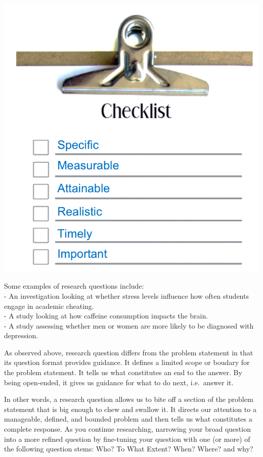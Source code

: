 \documentclass[openany]{book}
\begin{document}
\includegraphics{fig/SMART.png}

Some examples of research questions include:\\
- An investigation looking at whether stress levels influence how often students engage in academic cheating.\\
- A study looking at how caffeine consumption impacts the brain.\\
- A study assessing whether men or women are more likely to be diagnosed with depression.

As observed above, research question differs from the problem statement in that its question format provides guidance. It defines a limited scope or boudary for the problem statement. It tells us what constitutes an end to the answer. By being open-ended, it gives us guidance for what to do next, i.e.~answer it.

In other words, a research question allows us to bite off a section of the problem statement that is big enough to chew and swallow it. It directs our attention to a manageable, defined, and bounded problem and then tells us what constitutes a complete response.
As you continue researching, narrowing your broad question into a more refined question by fine-tuning your question with one (or more) of the following question stems: Who? To What Extent? When? Where? and why?
\end{document}
